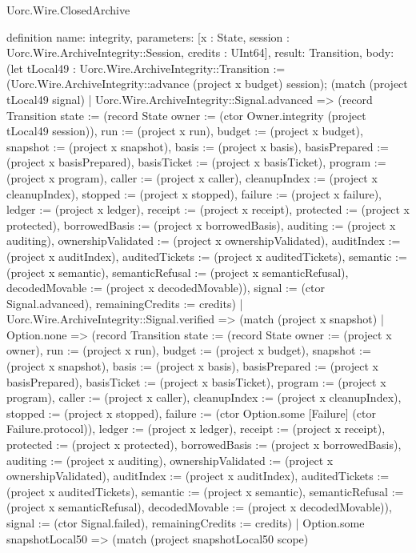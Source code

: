 \begin{lexlean}{Uorc.Wire.ClosedArchive}
\begin{semanticmodule}
definition{
  name: integrity,
  parameters: [x : State, session : Uorc.Wire.ArchiveIntegrity::Session, credits : UInt64],
  result: Transition,
  body: (let tLocal49 : Uorc.Wire.ArchiveIntegrity::Transition := (Uorc.Wire.ArchiveIntegrity::advance (project x budget) session); (match (project tLocal49 signal)
    | Uorc.Wire.ArchiveIntegrity::Signal.advanced => (record Transition {state := (record State {owner := (ctor Owner.integrity (project tLocal49 session)), run := (project x run), budget := (project x budget), snapshot := (project x snapshot), basis := (project x basis), basisPrepared := (project x basisPrepared), basisTicket := (project x basisTicket), program := (project x program), caller := (project x caller), cleanupIndex := (project x cleanupIndex), stopped := (project x stopped), failure := (project x failure), ledger := (project x ledger), receipt := (project x receipt), protected := (project x protected), borrowedBasis := (project x borrowedBasis), auditing := (project x auditing), ownershipValidated := (project x ownershipValidated), auditIndex := (project x auditIndex), auditedTickets := (project x auditedTickets), semantic := (project x semantic), semanticRefusal := (project x semanticRefusal), decodedMovable := (project x decodedMovable)}), signal := (ctor Signal.advanced), remainingCredits := credits})
    | Uorc.Wire.ArchiveIntegrity::Signal.verified => (match (project x snapshot)
      | Option.none => (record Transition {state := (record State {owner := (project x owner), run := (project x run), budget := (project x budget), snapshot := (project x snapshot), basis := (project x basis), basisPrepared := (project x basisPrepared), basisTicket := (project x basisTicket), program := (project x program), caller := (project x caller), cleanupIndex := (project x cleanupIndex), stopped := (project x stopped), failure := (ctor Option.some [Failure] (ctor Failure.protocol)), ledger := (project x ledger), receipt := (project x receipt), protected := (project x protected), borrowedBasis := (project x borrowedBasis), auditing := (project x auditing), ownershipValidated := (project x ownershipValidated), auditIndex := (project x auditIndex), auditedTickets := (project x auditedTickets), semantic := (project x semantic), semanticRefusal := (project x semanticRefusal), decodedMovable := (project x decodedMovable)}), signal := (ctor Signal.failed), remainingCredits := credits})
      | Option.some snapshotLocal50 => (match (project snapshotLocal50 scope)
}
\end{semanticmodule}
\end{lexlean}
